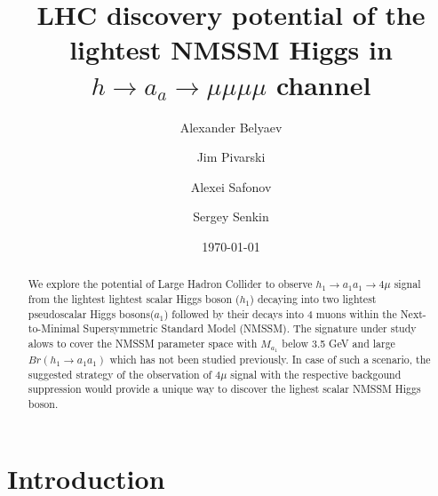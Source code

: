 \documentclass[aps,12pt,superscriptaddress,nofootinbib,floatfix,showpacs]{revtex4}
\begin{document}
\title
{LHC discovery potential 
of the lightest NMSSM Higgs in $h \to a_a \to \mu \mu \mu \mu$
channel}

\author{Alexander Belyaev}
\author{Jim Pivarski}
\author{Alexei Safonov}
\author{Sergey Senkin}


\date{\today}


\begin{abstract}
We explore the potential of Large Hadron Collider to observe  $h_1\to
a_1a_1\to 4\mu$ signal from the lightest lightest scalar Higgs boson
($h_1$) decaying into two  lightest pseudoscalar Higgs bosons($a_1$) 
followed by their decays into 4 muons within the Next-to-Minimal
Supersymmetric Standard Model (NMSSM).
The signature under study alows to cover the  NMSSM parameter space
with  $M_{a_1}$ below 3.5 GeV and large $Br(h_1\to a_1 a_1)$ 
which has not been studied previously. In case of  such a scenario,
the suggested strategy of the observation of 
$4\mu$ signal with the respective backgound suppression
would provide a unique way to discover
the lighest scalar NMSSM Higgs boson.
\end{abstract}


\maketitle
\newpage
\tableofcontents
\newpage

%
\section{Introduction}
\end{document}

